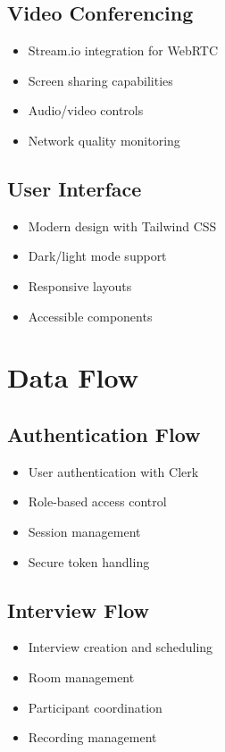 \documentclass[12pt,a4paper]{report}
\begin{document}
\subsection{Video Conferencing}
\begin{itemize}
   \item Stream.io integration for WebRTC
   \item Screen sharing capabilities
   \item Audio/video controls
   \item Network quality monitoring
\end{itemize}

\subsection{User Interface}
\begin{itemize}
   \item Modern design with Tailwind CSS
   \item Dark/light mode support
   \item Responsive layouts
   \item Accessible components
\end{itemize}

\section{Data Flow}

\subsection{Authentication Flow}
\begin{itemize}
   \item User authentication with Clerk
   \item Role-based access control
   \item Session management
   \item Secure token handling
\end{itemize}

\subsection{Interview Flow}
\begin{itemize}
   \item Interview creation and scheduling
   \item Room management
   \item Participant coordination
   \item Recording management
\end{itemize}
\end{document}
